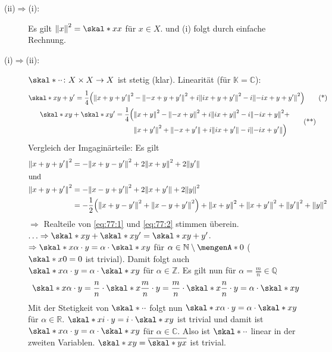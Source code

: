 \begin{description}
	\item[(ii)$\Rightarrow$(i):] Es gilt $\norm{x}^2 = \skal*{x}{x}$ für $x \in X$. und (i) folgt durch einfache Rechnung.
	\item[(i)$\Rightarrow$(ii):] $\skal*{\cdot}{\cdot} \colon X \times X \to X$ ist stetig (klar). Linearität (für $\mathds{K}=\mathds{C}$):
	\begin{gather*}
		\skal*{x}{y+y'} = \frac{1}{4} \enbrace*{\norm{x+y+y'}^2 - \norm{-x+y+y'}^2 + i  \norm{i x + y+ y'}^2 - i \norm{- ix +y+y'}^2} \label{eq:77:1}\tag{*} \\ 
		\begin{split}
			\skal*{x}{y} + \skal*{x}{y'} = \frac{1}{4} \Big( &\norm{x+y}^2 - \norm{-x+y}^2 + i  \norm{ix +y}^2 - i  \norm{-ix +y}^2 + \\
			&\norm{x+y'}^2 + \norm{-x+y'} + i  \norm{ix + y'} - i  \norm{-ix +y'} \Big)
		\end{split}
		\label{eq:77:2}\tag{**}
	\end{gather*}
	Vergleich der Imgaginärteile: Es gilt
	\begin{align*}
		\norm{x+y+y'}^2 &= - \norm{x+y-y'}^2 + 2 \norm{x+y}^2 + 2 \norm{y'}  \\
		\shortintertext{und}
		\norm{x+y+y'}^2 &= - \norm{x-y+y'}^2 + 2 \norm{x+y'} + 2 \norm{y}^2 \\
		&= - \frac{1}{2} \enbrace*{\norm{x+y-y'}^2 + \norm{x-y+y'}^2} + \norm{x+y}^2 + \norm{x+y'}^2 + \norm{y'}^2 + \norm{y}^2         
	\end{align*}
	$\Rightarrow$ Realteile von \eqref{eq:77:1} und \eqref{eq:77:2} stimmen überein. $\ldots \Rightarrow \skal*{x}{y} + \skal*{x}{y'}= \skal*{x}{y+y'}$.
	$\Rightarrow \skal*{x}{\alpha \cdot y} = \alpha \cdot \skal*{x}{y}$ für $\alpha \in \mathds{N} \setminus \set{0}$ ($\skal*{x}{0}=0$ ist trivial). Damit folgt auch
	$\skal*{x}{\alpha \cdot y} = \alpha \cdot \skal*{x}{y}$ für $\alpha \in \mathds{Z}$. Es gilt nun für $\alpha=\frac{m}{n} \in \mathds{Q}$
	\[
		\skal*{x}{\alpha \cdot y} = \frac{n}{n} \cdot \skal*{x}{\frac{m}{n} \cdot y } = \frac{m}{n} \cdot \skal*{x}{\frac{n}{n}\cdot y } = \alpha \cdot \skal*{x}{y}  
	\]
	Mit der Stetigkeit von $\skal*{\cdot}{\cdot}$ folgt nun $\skal*{x}{\alpha \cdot y} = \alpha \cdot \skal*{x}{y}$ für $\alpha \in \mathds{R}$.
	$\skal*{x}{i \cdot y} = i \cdot \skal*{x}{y}$ ist trivial und damit ist $\skal*{x}{\alpha \cdot y }= \alpha \cdot \skal*{x}{y}$ für $\alpha \in \mathds{C}$. Also ist
	$\skal*{\cdot}{\cdot}$ linear in der zweiten Variablen. $\skal*{x}{y} = \overline{\skal*{y}{x}}$ ist trivial. \bewende
\end{description}

